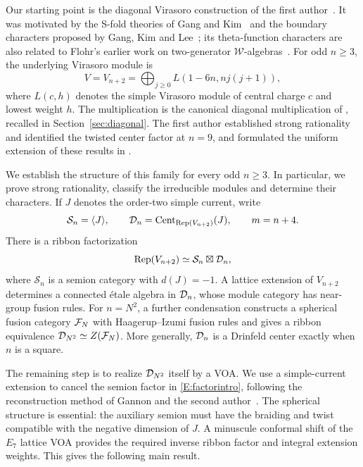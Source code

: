 \documentclass[11pt]{article}
\newcommand{\Scat}{\mathcal S}\newcommand{\U}{\mathcal U}\newcommand{\bo}{\boxtimes}
\numberwithin{equation}{section}
\begin{document}
Our starting point is the diagonal Virasoro construction of the first author~\cite{A:Evans}. It was motivated by the S-fold theories of Gang and Kim~\cite{I:GK} and the boundary characters proposed by Gang, Kim and Lee~\cite{I:GKL}; its theta-function characters are also related to Flohr's earlier work on two-generator $\mathcal W$-algebras~\cite{I:Flohr}. For odd $n\geq3$, the underlying Virasoro module is
\begin{equation}\label{A:construction}
V=V_{n+2}=\bigoplus_{j\geq0}L(1-6n,nj(j+1)),
\end{equation}
where $L(c,h)$ denotes the simple Virasoro module of central charge $c$ and lowest weight $h$. The multiplication is the canonical diagonal multiplication of \cite[Theorem~3.2]{A:Evans}, recalled in Section~\ref{sec:diagonal}. The first author established strong rationality and identified the twisted center factor at $n=9$, and formulated the uniform extension of these results in \cite[Conjecture~11.1]{A:Evans}.

We establish the structure of this family for every odd $n\geq3$. In particular, we prove strong rationality, classify the irreducible modules and determine their characters. If $J$ denotes the order-two simple current, write
\[
\Scat_n=\langle J\rangle,\qquad
\D_n=\operatorname{Cent}_{\Rep(V_{n+2})}(J),\qquad m=n+4.
\]
There is a ribbon factorization
\begin{equation}\label{E:factorintro}
\Rep(V_{n+2})\simeq\Scat_n\bo\D_n,
\end{equation}
where $\Scat_n$ is a semion category with $d(J)=-1$. A lattice extension of $V_{n+2}$ determines a connected \'etale algebra in $\mathcal D_n$, whose module category has near-group fusion rules. For $n=N^2$, a further condensation constructs a spherical fusion category $\mathcal F_N$ with Haagerup--Izumi fusion rules and gives a ribbon equivalence $\mathcal D_{N^2}\simeq Z(\mathcal F_N)$. More generally, $\mathcal D_n$ is a Drinfeld center exactly when $n$ is a square.

The remaining step is to realize $\mathcal D_{N^2}$ itself by a VOA. We use a simple-current extension to cancel the semion factor in \eqref{E:factorintro}, following the reconstruction method of Gannon and the second author~\cite[Theorem~2.3]{E:GR}. The spherical structure is essential: the auxiliary semion must have the braiding and twist compatible with the negative dimension of $J$. A minuscule conformal shift of the $E_7$ lattice VOA provides the required inverse ribbon factor and integral extension weights. This gives the following main result.
\end{document}
